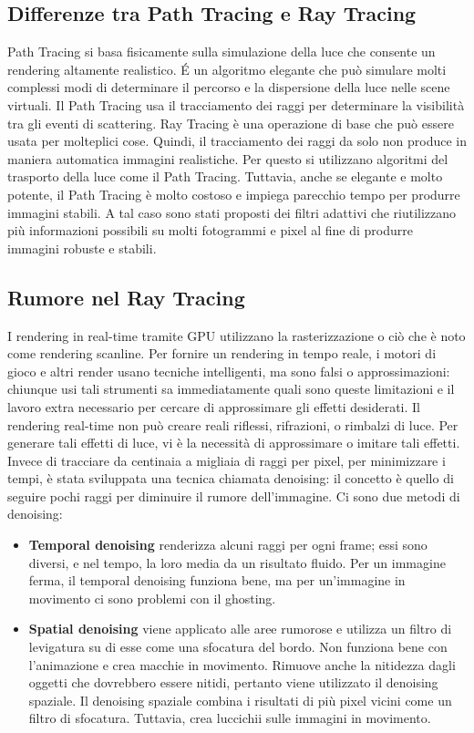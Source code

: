 \documentclass[9pt,a4paper,twoside]{tau}
\begin{document}
\subsection{Differenze tra Path Tracing e Ray Tracing}
Path Tracing si basa fisicamente sulla simulazione della luce che consente un rendering altamente realistico. \'E un algoritmo elegante che può simulare molti complessi modi di determinare il percorso e la dispersione della luce nelle scene virtuali. Il Path Tracing usa il tracciamento dei raggi per determinare la visibilità tra gli eventi di scattering. Ray Tracing è una operazione di base che può essere usata per molteplici cose. Quindi, il tracciamento dei raggi da solo non produce in maniera automatica immagini realistiche. Per questo si utilizzano algoritmi del trasporto della luce come il Path Tracing. Tuttavia, anche se elegante e molto potente, il Path Tracing è molto costoso e impiega parecchio tempo per produrre immagini stabili. A tal caso sono stati proposti dei filtri adattivi che riutilizzano più informazioni possibili su molti fotogrammi e pixel al fine di produrre immagini robuste e stabili.

\subsection{Rumore nel Ray Tracing}
I rendering in real-time tramite GPU utilizzano la rasterizzazione o ciò che è noto come rendering scanline. Per fornire un rendering in tempo reale, i motori di gioco e altri render usano tecniche intelligenti, ma sono falsi o approssimazioni: chiunque usi tali strumenti sa immediatamente quali sono queste limitazioni e il lavoro extra necessario per cercare di approssimare gli effetti desiderati. Il rendering real-time non può creare reali riflessi, rifrazioni, o rimbalzi di luce. Per generare tali effetti di luce, vi è la necessità di approssimare o imitare tali effetti.\\
Invece di tracciare da centinaia a migliaia di raggi per pixel, per minimizzare i tempi, è stata sviluppata una tecnica chiamata denoising: il concetto è quello di seguire pochi raggi per diminuire il rumore dell'immagine. Ci sono due metodi di denoising:
\begin{itemize}
	\item \textbf{Temporal denoising} renderizza alcuni raggi per ogni frame; essi sono diversi, e nel tempo, la loro media da un risultato fluido. Per un immagine ferma, il temporal denoising funziona bene, ma per un'immagine in movimento ci sono problemi con il ghosting. 
	\item \textbf{Spatial denoising} viene applicato alle aree rumorose e utilizza un filtro di levigatura su di esse come una sfocatura del bordo. Non funziona bene con l'animazione e crea macchie in movimento. Rimuove anche la nitidezza dagli oggetti che dovrebbero essere nitidi, pertanto viene utilizzato il denoising spaziale. Il denoising spaziale combina i risultati di più pixel vicini come un filtro di sfocatura. Tuttavia, crea luccichii sulle immagini in movimento.
\end{itemize}
\end{document}
